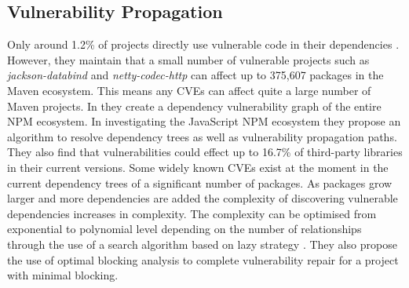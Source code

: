 \documentclass[10pt, compsoc, conference]{IEEEtran}
\begin{document}
\subsection{Vulnerability Propagation}
Only around 1.2\% of projects directly use vulnerable code in their dependencies \cite{a_m_mir_effect_2023}. However, they maintain that a small number of vulnerable projects such as \textit{jackson-databind} and \textit{netty-codec-http} can affect up to 375,607 packages in the Maven ecosystem. This means any CVEs can affect quite a large number of Maven projects. In \cite{c_liu_demystifying_2022} they create a dependency vulnerability graph of the entire NPM ecosystem. In investigating the JavaScript NPM ecosystem they propose an algorithm to resolve dependency trees as well as vulnerability propagation paths. They also find that vulnerabilities could effect up to 16.7\% of third-party libraries in their current versions. Some widely known CVEs exist at the moment in the current dependency trees of a significant number of packages. As packages grow larger and more dependencies are added the complexity of discovering vulnerable dependencies increases in complexity. The complexity can be optimised from exponential to polynomial level depending on the number of relationships through the use of a search algorithm based on lazy strategy \cite{w_hu_open_2019}. They also propose the use of optimal blocking analysis to complete vulnerability repair for a project with minimal blocking.
\end{document}
